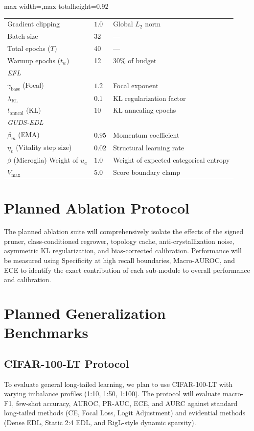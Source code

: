 \documentclass[letterpaper]{article} %
\begin{document}
\begin{table}[h]
\begin{adjustbox}{max width=\columnwidth,max totalheight=0.92\textheight}
\begin{tabular}{@{}p{}p{}p{}@{}}
Gradient clipping & $1.0$ & Global $L_2$ norm \\
Batch size & 32 & --- \\
Total epochs ($T$) & 40 & --- \\
Warmup epochs ($t_w$) & 12 & 30\% of budget \\
\midrule
\multicolumn{3}{l}{\emph{EFL}} \\
$\gamma_{\text{base}}$ (Focal) & $1.2$ & Focal exponent \\
$\lambda_{\text{KL}}$ & $0.1$ & KL regularization factor \\
$t_{\text{anneal}}$ (KL) & 10 & KL annealing epochs \\
\midrule
\multicolumn{3}{l}{\emph{GUDS-EDL}} \\
$\beta_m$ (EMA) & $0.95$ & Momentum coefficient \\
$\eta_v$ (Vitality step size) & $0.02$ & Structural learning rate \\
$\beta$ (Microglia) Weight of $u_a$ & $1.0$ & Weight of expected categorical entropy \\
$V_{\max}$ & $5.0$ & Score boundary clamp \\
\bottomrule
\end{tabular}
\end{adjustbox}
\end{table}


\section{Planned Ablation Protocol}
The planned ablation suite will comprehensively isolate the effects of the signed pruner, class-conditioned regrower, topology cache, anti-crystallization noise, asymmetric KL regularization, and bias-corrected calibration. Performance will be measured using Specificity at high recall boundaries, Macro-AUROC, and ECE to identify the exact contribution of each sub-module to overall performance and calibration.

\section{Planned Generalization Benchmarks}

\subsection{CIFAR-100-LT Protocol}
To evaluate general long-tailed learning, we plan to use CIFAR-100-LT with varying imbalance profiles (1:10, 1:50, 1:100). The protocol will evaluate macro-F1, few-shot accuracy, AUROC, PR-AUC, ECE, and AURC against standard long-tailed methods (CE, Focal Loss, Logit Adjustment) and evidential methods (Dense EDL, Static 2:4 EDL, and RigL-style dynamic sparsity).
\end{document}
